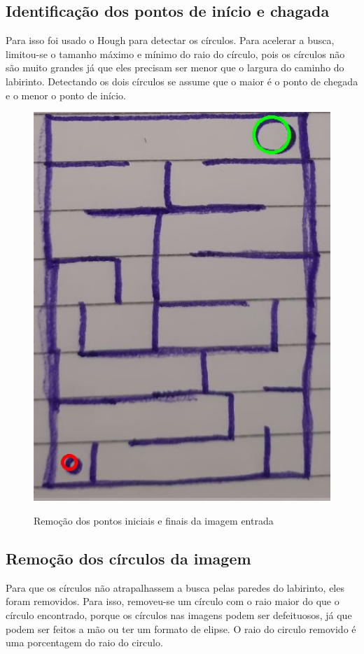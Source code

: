 \documentclass[conference]{IEEEtran}
\begin{document}
\subsection{Identificação dos pontos de início e chagada}
Para isso foi usado o Hough para detectar os círculos. Para acelerar a busca, limitou-se o tamanho máximo e mínimo do raio do círculo, pois os círculos não são muito grandes já que eles precisam ser menor que o largura do caminho do labirinto. Detectando os dois círculos se assume que o maior é o ponto de chegada e o menor o ponto de início.
 \begin{figure}[h!]
   \centering
    {\includegraphics[scale=0.25]{edgeImageWithoutCirclesmedium.jpg}
    \label{fig:medium}
    \caption{Remoção dos pontos iniciais e finais da imagem entrada}
    }
\end{figure}
\subsection{Remoção dos círculos da imagem}
Para que os círculos não atrapalhassem a busca pelas paredes do labirinto, eles foram removidos. Para isso, removeu-se um círculo com o raio maior do que o círculo encontrado, porque os círculos nas imagens podem ser defeituosos, já que podem ser feitos a mão ou ter um formato de elipse. O raio do circulo removido é uma porcentagem do raio do circulo.
\end{document}

